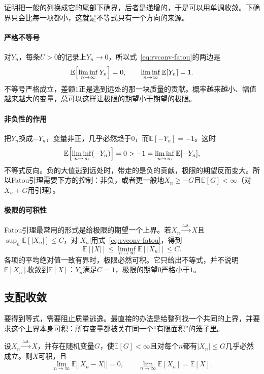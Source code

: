 证明把一般的列换成它的尾部下确界，后者是递增的，于是可以用单调收敛。下确界只会比每一项都小，这就是不等式只有一个方向的来源。

\paragraph{严格不等号}
对$Y_n$，每条$U>0$的记录上$Y_n\to0$，所以式~\eqref{eq:rvconv-fatou}的两边是
\[
 \mathbb{E}\Bigl[\liminf_{n\to\infty}Y_n\Bigr]=0,\qquad \liminf_{n\to\infty}\mathbb{E}[Y_n]=1 .
\]
不等号严格成立，差额$1$正是逃到远处的那一块质量的贡献。概率越来越小、幅值越来越大的变量，总可以这样让极限的期望小于期望的极限。

\paragraph{非负性的作用}
把$Y_n$换成$-Y_n$，变量非正，几乎必然趋于$0$，而$\mathbb{E}[-Y_n]=-1$。这时
\[
 \mathbb{E}\Bigl[\liminf_{n\to\infty}(-Y_n)\Bigr]=0>-1=\liminf_{n\to\infty}\mathbb{E}[-Y_n] ,
\]
不等式反向。负的大值逃到远处时，带走的是负的贡献，极限的期望反而变大。所以Fatou引理需要下方的控制：非负，或者更一般地$X_n\geq-G$且$\mathbb{E}[G]<\infty$（对$X_n+G$用引理）。

\paragraph{极限的可积性}
Fatou引理最常用的形式是给极限的期望一个上界。若$X_n\xrightarrow{\mathrm{a.s.}}X$且$\sup_n\mathbb{E}[\lvert X_n\rvert]\leq C$，对$\lvert X_n\rvert$用式~\eqref{eq:rvconv-fatou}，得到
\begin{equation}
 \mathbb{E}[\lvert X\rvert]\leq\liminf_{n\to\infty}\mathbb{E}[\lvert X_n\rvert]\leq C .
 \label{eq:rvconv-fatou-bound}
\end{equation}
各项的平均绝对值一致有界时，极限必然可积。它只给出不等式，并不说明$\mathbb{E}[X_n]$收敛到$\mathbb{E}[X]$：$Y_n$满足$C=1$，极限的期望$0$严格小于$1$。

\subsection{支配收敛}
\label{sec:rvconv-dominated}

要得到等式，需要阻止质量逃逸。最直接的办法是给整列找一个共同的上界，并要求这个上界本身可积：所有变量都被关在同一个“有限面积”的笼子里。

\begin{theorem}[支配收敛定理]
\label{thm:rvconv-dominated}
设$X_n\xrightarrow{\mathrm{a.s.}}X$，并存在随机变量$G$，使$\mathbb{E}[G]<\infty$且对每个$n$都有$\lvert X_n\rvert\leq G$几乎必然成立。则$X$可积，且
\begin{equation}
 \lim_{n\to\infty}\mathbb{E}\bigl[\lvert X_n-X\rvert\bigr]=0,\qquad \lim_{n\to\infty}\mathbb{E}[X_n]=\mathbb{E}[X] .
 \label{eq:rvconv-dominated}
\end{equation}
\end{theorem}


